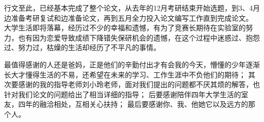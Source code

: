 
\acknowledgement
\par 行文至此，已经基本完成了整个论文，从去年的12月考研结束开始选题，到3、4月边准备考研复试和边准备论文，再到五月全力投入论文编写工作直到完成论文。
大学生活即将落幕，经历过不少的幸福和遗憾，有为了竞赛长期待在实验室的努力，也有因为恋爱导致成绩下降错失保研机会的遗憾，在这个过程中迷惑过、抱怨过、努力过，枯燥的生活却经历了不平凡的事情。
\par 最值得感谢的人还是爸妈，正是他们的辛勤付出才有会我的今天，懵懂的少年逐渐长大才懂得生活的不易，还希望在未来的学习、工作生涯中不负他们的期待；
其次要感谢的我的指导老师刘小玲老师，面对我们提出的问题都不厌其烦的解答，也针对我们论文的问题给出了相当详细的指导；
后要感谢陪伴四年大学生活的室友，四年的融洽相处，互相关心扶持；
最后要感谢你、我、他她它以及远方的那个人。